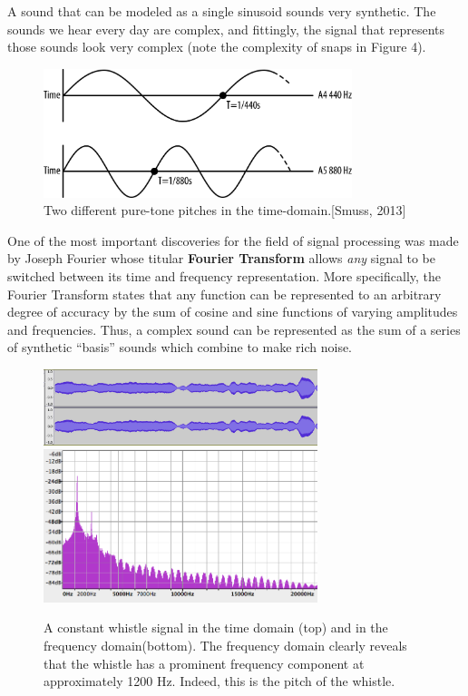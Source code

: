 \documentclass[DIV=calc, paper=a4, fontsize=11pt, twocolumn]{scrartcl}   %
\begin{document}
\par A sound that can be modeled as a single sinusoid sounds very synthetic. The sounds we hear every day are complex, and fittingly, the signal that represents those sounds look very complex (note the complexity of snaps in Figure 4).

\begin{figure}[h]
\centering
\includegraphics[width=90mm]{figures/PitchGraph.png}
\caption{Two different pure-tone pitches in the time-domain.[Smuss, 2013]}
\label{overflow}
\end{figure}

   One of the most important discoveries for the field of signal processing was made by Joseph Fourier whose titular \textbf{Fourier Transform} allows \textit{any} signal to be switched between its time and frequency representation. More specifically, the Fourier Transform states that any function can be represented to an arbitrary degree of accuracy by the sum of cosine and sine functions of varying amplitudes and frequencies. Thus, a complex sound can be represented as the sum of a series of synthetic ``basis'' sounds which combine to make rich noise.

\begin{figure}[h]
\centering
\includegraphics[width=80mm]{figures/whistletimedomain.png}
\includegraphics[width=80mm]{figures/frequencydomainwhistle.png}
\caption{A constant whistle signal in the time domain (top) and in the frequency domain(bottom). The frequency domain clearly reveals that the whistle has a prominent frequency component at approximately 1200 Hz. Indeed, this is the pitch of the whistle. }
\label{overflow}
\end{figure}
\end{document}
